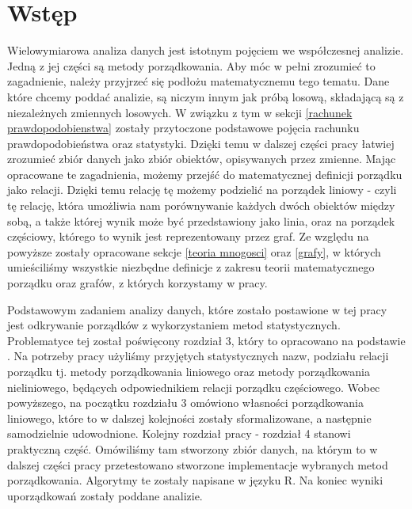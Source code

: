 \documentclass[12pt,a4paper]{report}
\begin{document}
\chapter{Wstęp}
Wielowymiarowa analiza danych jest istotnym pojęciem we współczesnej analizie. Jedną z jej części są metody porządkowania. Aby móc w pełni zrozumieć to zagadnienie, należy przyjrzeć się podłożu matematycznemu tego tematu. 
Dane które chcemy poddać analizie, są niczym innym jak próbą losową, składającą są z niezależnych zmiennych losowych. W związku z tym w sekcji \ref{rachunek prawdopodobienstwa} zostały przytoczone podstawowe pojęcia rachunku prawdopodobieństwa oraz statystyki. Dzięki temu w dalszej części pracy łatwiej zrozumieć zbiór danych jako zbiór obiektów, opisywanych przez zmienne. Mając opracowane te zagadnienia, możemy przejść do matematycznej definicji porządku jako relacji. Dzięki temu relację tę możemy podzielić na porządek liniowy - czyli tę relację, która umożliwia nam porównywanie każdych dwóch obiektów między sobą, a także której wynik może być przedstawiony jako linia, oraz na porządek częściowy, którego to wynik jest reprezentowany przez graf. Ze względu na powyższe zostały opracowane sekcje \ref{teoria mnogosci} oraz \ref{grafy}, w których umieściliśmy wszystkie niezbędne definicje z zakresu teorii matematycznego porządku oraz grafów, z których korzystamy w pracy. 

Podstawowym zadaniem analizy danych, które zostało postawione w tej pracy jest odkrywanie porządków z wykorzystaniem metod statystycznych. Problematyce tej został poświęcony rozdział 3, który to opracowano na podstawie \citep{panek2013}. Na potrzeby pracy użyliśmy przyjętych statystycznych nazw, podziału relacji porządku tj. metody porządkowania liniowego oraz metody porządkowania nieliniowego, będących odpowiednikiem relacji porządku częściowego. Wobec powyższego, na początku rozdziału 3 omówiono własności porządkowania liniowego, które to w dalszej kolejności zostały sformalizowane, a następnie samodzielnie udowodnione. Kolejny rozdział pracy - rozdział 4 stanowi praktyczną część. Omówiliśmy tam stworzony zbiór danych, na którym to w dalszej części pracy przetestowano stworzone implementacje wybranych metod porządkowania. Algorytmy te zostały napisane w języku R. Na koniec wyniki uporządkowań zostały poddane analizie. 
\end{document}
